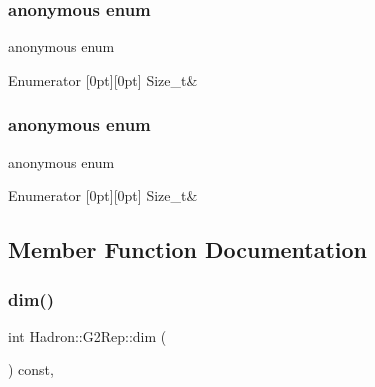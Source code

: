 \subsubsection{\texorpdfstring{anonymous enum}{anonymous enum}}
{\footnotesize\ttfamily anonymous enum}

\begin{DoxyEnumFields}{Enumerator}
[0pt][0pt]{}\mbox{\label{structHadron_1_1G2Rep_a5e1b9f4542c56aafee97806d019f746cad57403b756f8e944c60ba8b7b2dd6bef}} 
Size\+\_\+t&\\
\hline

\end{DoxyEnumFields}
\mbox{\label{structHadron_1_1G2Rep_a5e1b9f4542c56aafee97806d019f746c}} 
\subsubsection{\texorpdfstring{anonymous enum}{anonymous enum}}
{\footnotesize\ttfamily anonymous enum}

\begin{DoxyEnumFields}{Enumerator}
[0pt][0pt]{}\mbox{\label{structHadron_1_1G2Rep_a5e1b9f4542c56aafee97806d019f746cad57403b756f8e944c60ba8b7b2dd6bef}} 
Size\+\_\+t&\\
\hline

\end{DoxyEnumFields}


\subsection{Member Function Documentation}
\mbox{\label{structHadron_1_1G2Rep_a7c8d894ff5da6fead1964484c04a4c80}} 
\subsubsection{\texorpdfstring{dim()}{dim()}\hspace{0.1cm}{\footnotesize\ttfamily [1/3]}}
{\footnotesize\ttfamily int Hadron\+::\+G2\+Rep\+::dim (\begin{DoxyParamCaption}{ }\end{DoxyParamCaption}) const\hspace{0.3cm}{\ttfamily [inline]}, {\ttfamily [virtual]}}



